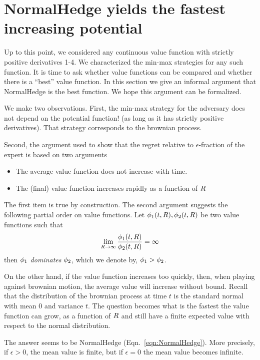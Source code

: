 \documentclass{article}[12pt]
\begin{document}
\section{NormalHedge yields the fastest increasing potential} \label{sec:NormalHedge}

Up to this point, we considered any continuous value function with
strictly positive derivatives 1-4. We characterized the min-max
strategies for any such function. It is time to ask whether value
functions can be compared and whether there is a ``best'' value
function. In this section we give an informal argument that
NormalHedge is the best function. We hope this argument can be
formalized.

We make two observations. First, the min-max strategy for the
adversary does not depend on the potential function! (as long as it
has strictly positive derivatives). That strategy corresponds to the
brownian process.

Second, the argument used to show that the regret relative to
$\epsilon$-fraction of the expert is based on two arguments
\begin{itemize}
\item The average value function does not increase with time.
\item The (final) value function increases rapidly as a function of $R$
\end{itemize}
The first item is true by construction. The second argument suggests
the following partial order on value functions. Let
$\phi_1(t,R),\phi_2(t,R)$ be two value functions such that
\[
\lim_{R \to \infty} \frac{\phi_1(t,R)}{\phi_2(t,R)} = \infty  
\]
then $\phi_1$ {\em dominates} $\phi_2$, which we denote by, $\phi_1 > \phi_2$.

On the other hand, if the value function increases too quickly, then,
when playing against brownian motion, the average value will increase
without bound.  Recall that the distribution of the brownian process
at time $t$ is the standard normal with mean 0 and variance $t$.
The question becomes what is the fastest the value
function can grow, as a function of $R$ and still have a finite
expected value with respect to the normal distribution.

The answer seems to be NormalHedge (Eqn.~\ref{eqn:NormalHedge}). More
precisely, if $\epsilon>0$, the mean value is finite, but if
$\epsilon=0$ the mean value becomes infinite.




\appendix
\end{document}
